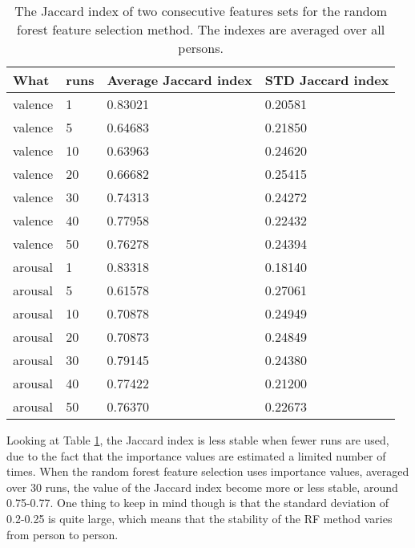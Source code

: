 \begin{table}[H]
\centering
\caption{The Jaccard index of two consecutive features sets for the random forest feature selection method. The indexes are averaged over all persons.\label{specificJaccard}}
\begin{tabular}{l|l|ll}
\textbf{What} & \textbf{runs} & \textbf{Average Jaccard index} & \textbf{STD Jaccard index} \\ \hline
valence       & 1             & 0.83021                   & 0.20581               \\
valence       & 5             & 0.64683                   & 0.21850               \\
valence       & 10            & 0.63963                   & 0.24620               \\
valence       & 20            & 0.66682                   & 0.25415               \\
valence       & 30            & 0.74313                   & 0.24272               \\
valence       & 40            & 0.77958                   & 0.22432               \\
valence       & 50            & 0.76278                   & 0.24394               \\ \hline
arousal       & 1             & 0.83318                   & 0.18140               \\
arousal       & 5             & 0.61578                   & 0.27061               \\
arousal       & 10            & 0.70878                   & 0.24949               \\
arousal       & 20            & 0.70873                   & 0.24849               \\
arousal       & 30            & 0.79145                   & 0.24380               \\
arousal       & 40            & 0.77422                   & 0.21200               \\
arousal       & 50            & 0.76370                   & 0.22673              
\end{tabular}
\end{table}

Looking at Table \ref{specificJaccard}, the Jaccard index is less stable when fewer runs are used, due to the fact that the importance values are estimated a limited number of times. When the random forest feature selection uses importance values, averaged over 30 runs, the value of the Jaccard index become more or less stable, around 0.75-0.77. One thing to keep in mind though is that the standard deviation of 0.2-0.25 is quite large, which means that the stability of the RF method varies from person to person.
